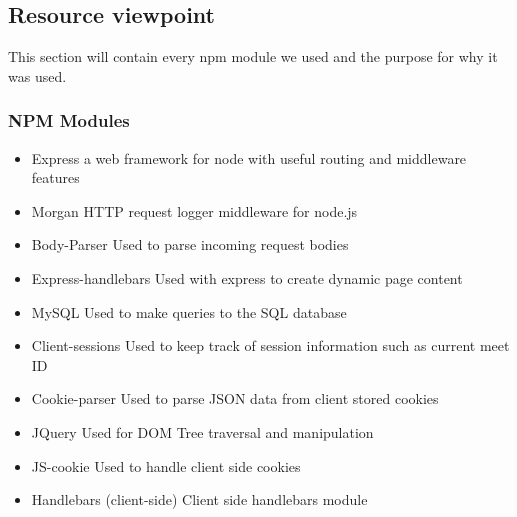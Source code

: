 \documentclass[letterpaper,10pt,draftclsnofoot,onecolumn,]{article}
\begin{document}
\subsection{Resource viewpoint}
This section will contain every npm module we used and the purpose for why it was used. 
\subsubsection{NPM Modules}
\begin{itemize}
    \item Express
    \subitem a web framework for node with useful routing and middleware features
    \item Morgan
    \subitem HTTP request logger middleware for node.js
    \item Body-Parser
    \subitem Used to parse incoming request bodies
    \item Express-handlebars
    \subitem Used with express to create dynamic page content
    \item MySQL
    \subitem Used to make queries to the SQL database
    \item Client-sessions
    \subitem Used to keep track of session information such as current meet ID
    \item Cookie-parser
    \subitem Used to parse JSON data from client stored cookies
    \item JQuery
    \subitem Used for DOM Tree traversal and manipulation
    \item JS-cookie
    \subitem Used to handle client side cookies
    \item Handlebars (client-side)
    \subitem Client side handlebars module
\end{itemize}
\end{document}
